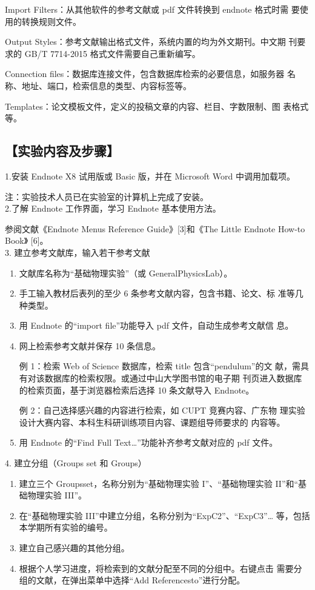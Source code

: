 \documentclass[12pt,a4paper,UTF8]{ctexart}
\begin{document}
Import Filters：从其他软件的参考文献或 pdf 文件转换到 endnote 格式时需
要使用的转换规则文件。

Output Styles：参考文献输出格式文件，系统内置的均为外文期刊。中文期
刊要求的 GB/T 7714-2015 格式文件需要自己重新编写。

Connection files：数据库连接文件，包含数据库检索的必要信息，如服务器
名称、地址、端口，检索信息的类型、内容标签等。

Templates：论文模板文件，定义的投稿文章的内容、栏目、字数限制、图
表格式等。


\subsection*{【实验内容及步骤】}
1.安装 Endnote X8 试用版或 Basic 版，并在 Microsoft Word 中调用加载项。

注：实验技术人员已在实验室的计算机上完成了安装。\\

2.了解 Endnote 工作界面，学习 Endnote 基本使用方法。

参阅文献《Endnote Menus Reference Guide》[3]和《The Little Endnote How-to Book》
[6]。\\

3. 建立参考文献库，输入若干参考文献

	\begin{enumerate}[(1)]
			\item 文献库名称为“基础物理实验”（或 GeneralPhysicsLab）。
			\item 手工输入教材后表列的至少 6 条参考文献内容，包含书籍、论文、标
			准等几种类型。
			\item 用 Endnote 的“import file”功能导入 pdf 文件，自动生成参考文献信
			息。
			\item 网上检索参考文献并保存 10 条信息。
			
			例 1：检索 Web of Science 数据库，检索 title 包含“pendulum”的文
			献，需具有对该数据库的检索权限。或通过中山大学图书馆的电子期
			刊页进入数据库的检索页面，基于浏览器检索后选择 10 条文献导入
			Endnote。

			例 2：自己选择感兴趣的内容进行检索，如 CUPT 竞赛内容、广东物
			理实验设计大赛内容、本科生科研训练项目内容、课题组导师要求的
			内容等。
			\item 用 Endnote 的“Find Full Text…”功能补齐参考文献对应的 pdf 文件。			
	\end{enumerate}

	4. 建立分组（Groups set 和 Groups）

	\begin{enumerate}[(1)]
		\item 建立三个 Groupsset，名称分别为“基础物理实验 I”、“基础物理实验
		II”和“基础物理实验 III”。
		\item 在“基础物理实验 III”中建立分组，名称分别为“ExpC2”、“ExpC3”…
		等，包括本学期所有实验的编号。
		\item 建立自己感兴趣的其他分组。
		\item 根据个人学习进度，将检索到的文献分配至不同的分组中。右键点击
		需要分组的文献，在弹出菜单中选择“Add Referencesto”进行分配。
	\end{enumerate}
\end{document}
